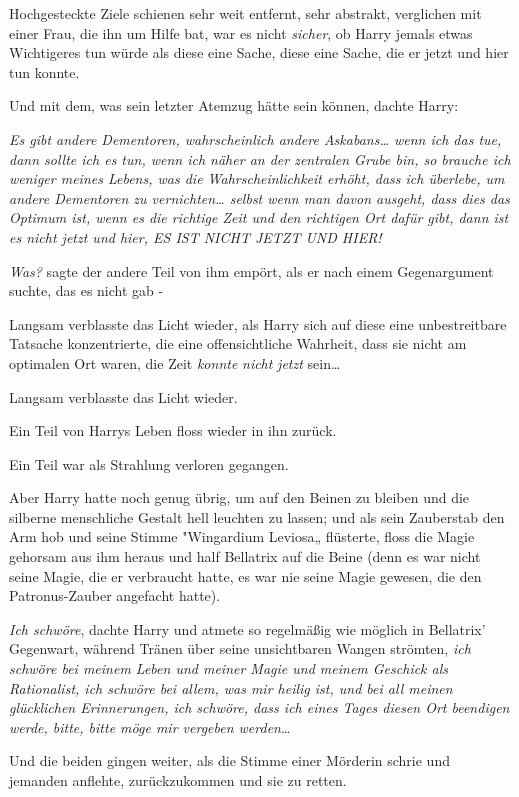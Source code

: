 {Hochgesteckte Ziele schienen sehr weit entfernt, sehr abstrakt, verglichen mit einer Frau, die ihn um Hilfe bat, war es nicht \emph{sicher}, ob Harry jemals etwas Wichtigeres tun würde als diese eine Sache, diese eine Sache, die er jetzt und hier tun konnte.

Und mit dem, was sein letzter Atemzug hätte sein können, dachte Harry:

\emph{\emph{Es gibt andere Dementoren, wahrscheinlich andere Askabans… wenn ich das tue, dann sollte ich es tun, wenn ich näher an der zentralen Grube bin, so brauche ich weniger meines Lebens, was die Wahrscheinlichkeit erhöht, dass ich überlebe, um andere Dementoren zu vernichten… selbst wenn man davon ausgeht, dass dies das Optimum ist, wenn es die richtige Zeit und den richtigen Ort dafür gibt, dann ist es nicht jetzt und hier, ES IST NICHT JETZT UND HIER!}}

\emph{Was?} sagte der andere Teil von ihm empört, als er nach einem Gegenargument suchte, das es nicht gab -

Langsam verblasste das Licht wieder, als Harry sich auf diese eine unbestreitbare Tatsache konzentrierte, die eine offensichtliche Wahrheit, dass sie nicht am optimalen Ort waren, die Zeit \emph{konnte} \emph{nicht} \emph{jetzt} sein…

Langsam verblasste das Licht wieder.

Ein Teil von Harrys Leben floss wieder in ihn zurück.

Ein Teil war als Strahlung verloren gegangen.

Aber Harry hatte noch genug übrig, um auf den Beinen zu bleiben und die silberne menschliche Gestalt hell leuchten zu lassen; und als sein Zauberstab den Arm hob und seine Stimme "Wingardium Leviosa„ flüsterte, floss die Magie gehorsam aus ihm heraus und half Bellatrix auf die Beine (denn es war nicht seine Magie, die er verbraucht hatte, es war nie seine Magie gewesen, die den Patronus-Zauber angefacht hatte).

\emph{Ich schwöre}, dachte Harry und atmete so regelmäßig wie möglich in Bellatrix' Gegenwart, während Tränen über seine unsichtbaren Wangen strömten, \emph{ich schwöre bei meinem Leben und meiner Magie und meinem Geschick als Rationalist, ich schwöre bei allem, was mir heilig ist, und bei all meinen glücklichen Erinnerungen, ich schwöre, dass ich eines Tages diesen Ort beendigen werde, bitte, bitte möge mir vergeben werden}…

Und die beiden gingen weiter, als die Stimme einer Mörderin schrie und jemanden anflehte, zurückzukommen und sie zu retten.

}
